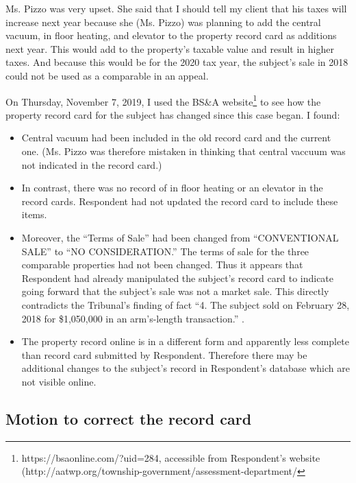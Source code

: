 \documentclass[12pt,\documentclassflag]{michiganCourtOfAppealsBrief}
\begin{document}
Ms. Pizzo was very upset. She said that I should tell my client that his taxes will increase next year because she (Ms. Pizzo) was planning to add the central vacuum, in floor heating, and elevator to the property record card as additions next year. This would add to the property's taxable value and result in higher taxes. And because this would be for the 2020 tax year, the subject's sale in 2018 could not be used as a comparable in an appeal.

On Thursday, November 7, 2019, I used the BS&A website\footnote{https://bsaonline.com/?uid=284, accessible from   Respondent's website (http://aatwp.org/township-government/assessment-department/}
to see how the property record card for the subject has changed since this case began.
I found:

\begin{itemize}
\item Central vacuum had been included in the old record card and the current one. (Ms. Pizzo was therefore mistaken in thinking that central vaccuum was not indicated in the record card.)
\item In contrast, there was no record of in floor heating or an elevator in the record cards. Respondent had not updated the record card to include these items.
\item Moreover, the ``Terms of Sale'' had been changed from ``CONVENTIONAL SALE'' to ``NO CONSIDERATION.''
  The terms of sale for the three comparable properties %
  had not been changed. Thus it appears that Respondent had already manipulated the subject's record card to indicate going forward that the subject's sale was not a market sale. This directly contradicts the Tribunal's finding of fact ``4. The subject sold on February 28, 2018 for \$1,050,000 in an arm's-length transaction.'' .
\item The property record online is in a different form and apparently less complete than record card submitted by Respondent. Therefore there may be additional changes to the subject's record in Respondent's database which are not visible online.
\end{itemize}

\subsection{Motion to correct the record card}
\end{document}
